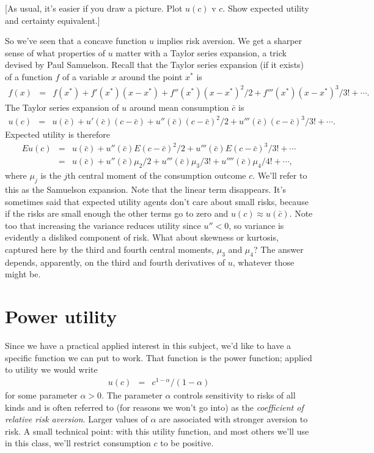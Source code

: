 \documentclass[11pt]{article}
\newcommand{\cbar}{\bar{c}}
\begin{document}
[As usual, it's easier if you draw a picture.
Plot $u(c)$ v $c$.
Show expected utility and certainty equivalent.]

So we've seen that a concave function $u$ implies risk aversion.
We get a sharper sense of what properties of $u$ matter with
a Taylor series expansion,
a trick devised by Paul Samuelson.
Recall that the Taylor series expansion (if it exists) of a
function $f$ of a variable $x$ around the point $x^*$ is
\begin{eqnarray*}
    f(x) &=& f(x^*) + f'(x^*) (x-x^*) + f''(x^*) (x-x^*)^2/2 +
        f'''(x^*) (x-x^*)^3/3! + \cdots .
\end{eqnarray*}
The Taylor series expansion of $u$ around mean consumption $\cbar$
is
\begin{eqnarray*}
    u(c) &=& u(\cbar) + u'(\cbar) (c-\cbar)  + u''(\cbar) (c-\cbar)^2/2
        + u'''(\cbar) (c-\cbar)^3/3! + \cdots .
\end{eqnarray*}
Expected utility is therefore
\begin{eqnarray}
  E u(c) &=& u(\cbar) + u''(\cbar) E (c-\cbar)^2/2
        + u'''(\cbar) E (c-\cbar)^3/3! + \cdots \nonumber \\
        &=& u(\cbar) + u''(\cbar) \mu_2/2
            + u'''(\cbar) \mu_3 /3! + u''''(\cbar) \mu_4 /4! + \cdots ,
        \label{eq:eu-samuelson}
\end{eqnarray}
where $\mu_j$ is the $j$th central moment of the consumption outcome $c$.
We'll refer to this as the Samuelson expansion.
Note that the linear term disappears.
It's sometimes said that expected utility agents
don't care about small risks, because if the risks are small enough
the other terms go to zero and $u(c) \approx u(\cbar)$.
Note too that increasing the variance reduces
utility since $u'' < 0$,
so variance is evidently a disliked component of risk.
What about skewness or kurtosis, captured here by the third
and fourth central moments, $\mu_3$ and $\mu_4$?
The answer depends, apparently,
on the third and fourth derivatives of $u$,
whatever those might be.


\section{Power utility}

Since we have a practical applied interest in this subject,
we'd like to have a specific function we can put to work.
That function is the power function;
applied to utility we would write
\begin{eqnarray*}
    u(c) &=& c^{1-\alpha}/(1-\alpha)
\end{eqnarray*}
for some parameter $\alpha > 0$.
The parameter $\alpha$ controls sensitivity to risks of all kinds
and is often referred to (for reasons we won't go into)
as the {\it coefficient of relative risk aversion\/}.
Larger values of $\alpha$ are associated with stronger aversion to risk.
A small technical point:  with this utility function,
and most others we'll use in this class,
we'll restrict consumption $c$ to be positive.
\end{document}
